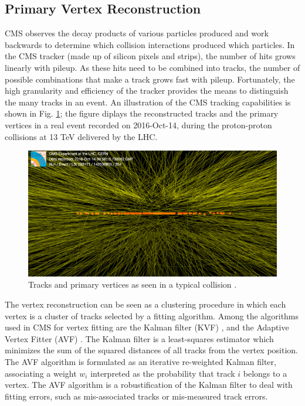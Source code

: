 \subsection{Primary Vertex Reconstruction} 
CMS observes the decay products of various particles produced and work backwards to determine which collision interactions produced which particles. In the CMS tracker (made up of silicon pixels and strips), the number of hits grows linearly with pileup. As these hits need to be combined into tracks, the number of possible combinations that make a track grows fast with pileup. Fortunately, the high granularity and efficiency of the tracker provides the means to distinguish the many tracks in an event. An illustration of the CMS tracking capabilities is shown in Fig. \ref{pileup}; the figure diplays the reconstructed tracks and the primary vertices in a real event recorded on 2016-Oct-14, during the proton-proton collisions at 13 TeV delivered by the LHC. 
\begin{figure}[ht]
\centering
\includegraphics[scale=1.34]{figures/experiment/highpileup.png} 
\caption[Tracks in a typical collision]{Tracks and primary vertices as seen in a typical collision \cite{McCauley:2231915}.}
\label{pileup}
\end{figure}

The vertex reconstruction can be seen as a clustering procedure in which each vertex is a cluster of tracks selected by a fitting algorithm. Among the algorithms used in CMS for vertex fitting are the Kalman filter (KVF) \cite{Fruhwirth:1991pm}, and the Adaptive Vertex Fitter (AVF) \cite{Fruhwirth:2003xw}. The Kalman filter is a least-squares estimator which minimizes the sum of the squared distances of all tracks from the vertex position. The AVF algorithm is formulated as an iterative re-weighted Kalman filter, associating a weight $w_i$ interpreted as the probability that track $i$ belongs to a vertex. The AVF algorithm is a robustification of the Kalman filter to deal with fitting errors, such as mis-associated tracks or mis-measured track errors.

